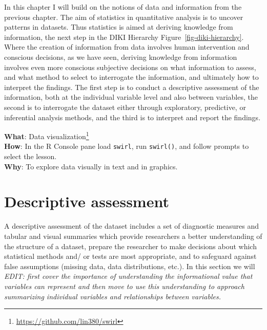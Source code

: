 \documentclass[
  letterpaper,
]{latex/krantz}
\DeclareRobustCommand{\href}[2]{#2\footnote{\url{#1}}}
\begin{document}
In this chapter I will build on the notions of data and information from
the previous chapter. The aim of statistics in quantitative analysis is
to uncover patterns in datasets. Thus statistics is aimed at deriving
knowledge from information, the next step in the DIKI Hierarchy
Figure~\ref{fig-diki-hierarchy}. Where the creation of information from
data involves human intervention and conscious decisions, as we have
seen, deriving knowledge from information involves even more conscious
subjective decisions on what information to assess, and what method to
select to interrogate the information, and ultimately how to interpret
the findings. The first step is to conduct a descriptive assessment of
the information, both at the individual variable level and also between
variables, the second is to interrogate the dataset either through
exploratory, predictive, or inferential analysis methods, and the third
is to interpret and report the findings.

\begin{tcolorbox}[enhanced jigsaw, colbacktitle=quarto-callout-tip-color!10!white, arc=.35mm, toprule=.15mm, breakable, colframe=quarto-callout-tip-color-frame, bottomrule=.15mm, opacitybacktitle=0.6, coltitle=black, titlerule=0mm, colback=white, toptitle=1mm, bottomtitle=1mm, title=\textcolor{quarto-callout-tip-color}{\faLightbulb}\hspace{0.5em}{Interactive programming}, rightrule=.15mm, leftrule=.75mm, opacityback=0, left=2mm]

\textbf{What}: \href{https://github.com/lin380/swirl}{Data
visualization}\\
\textbf{How}: In the R Console pane load \texttt{swirl}, run
\texttt{swirl()}, and follow prompts to select the lesson.\\
\textbf{Why}: To explore data visually in text and in graphics.

\end{tcolorbox}

\hypertarget{aa-descriptive-assessment}{%
\section{Descriptive assessment}\label{aa-descriptive-assessment}}

A descriptive assessment of the dataset includes a set of diagnostic
measures and tabular and visual summaries which provide researchers a
better understanding of the structure of a dataset, prepare the
researcher to make decisions about which statistical methods and/ or
tests are most appropriate, and to safeguard against false assumptions
(missing data, data distributions, etc.). In this section we will
\emph{EDIT: first cover the importance of understanding the
informational value that variables can represent and then move to use
this understanding to approach summarizing individual variables and
relationships between variables.}
\end{document}
